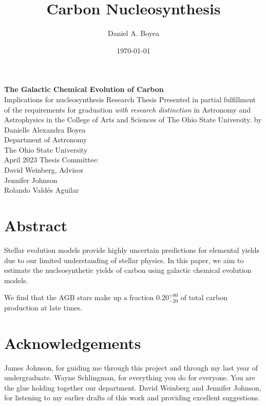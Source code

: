 \documentclass[12pt,oneside]{report}
\title{Carbon Nucleosynthesis}
\author{Daniel A. Boyea}
\date{\today}
\begin{document}


\begin{titlepage}
   \begin{center}
       \vfill
       \textbf{The Galactic Chemical Evolution of Carbon} \\
        Implications for nucleosynthesis
        \vfill
        Research Thesis
        \vfill
        Presented in partial fulfillment of the requirements for graduation \textit{with research distinction} in Astronomy and Astrophysics in the College of Arts and Sciences of The Ohio State University.
        \vfill
        by 
        \vfill
       {Danielle Alexandra Boyea}\\
       \vfill
       Department of Astronomy\\
       The Ohio State University\\
       \vfill
       April 2023
       \vfill
       Thesis Committee:\\
       David Weinberg, Advisor \\
       Jennifer Johnson \\
       Rolando Vald\'es Aguilar\\
       \vfill
            
   \end{center}
\end{titlepage}



\chapter*{Abstract}
Stellar evolution models provide highly uncertain predictions for elemental yields due to our limited understanding of stellar physics. In this paper, we aim to estimate the nucleosynthetic yields of carbon using galactic chemical evolution models. 

We find that the AGB stars make up a fraction $0.20_{-20}^{+80}$ of total carbon production at late times. 

\chapter*{Acknowledgements}

James Johnson, for guiding me through this project and through my last year of undergraduate.
Wayne Schlingman, for everything you do for everyone. You are the glue holding together our department.
David Weinberg and Jennifer Johnson, for listening to my earlier drafts of this work and providing excellent suggestions.
\end{document}
